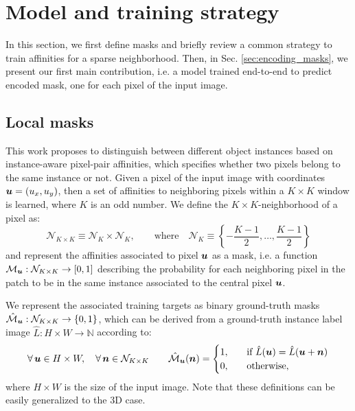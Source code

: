 
\section{Model and training strategy}\label{sec:model}
In this section, we first define \maskname masks and briefly review a common strategy to train affinities for a sparse neighborhood.
Then, in Sec. \ref{sec:encoding_masks}, we present our first main contribution, i.e. a model trained end-to-end to predict encoded \maskname mask, one for each pixel of the input image. 

\subsection{Local \maskname masks}\label{sec:self_masks}
This work proposes to distinguish between different object instances based on instance-aware pixel-pair affinities, which specifies whether two pixels belong to the same instance or not.
Given a pixel of the input image with coordinates $\coord{u}= (u_x, u_y)$, then a set of affinities to neighboring pixels within a $K\times K$ window is learned, where $K$ is an odd number. 
We define the $K\times K$-neighborhood of a pixel as:
\begin{equation}
\mathcal{N}_{K\times K} \equiv \mathcal{N}_{K} \times \mathcal{N}_{K}, \qquad \text{where} \quad \mathcal{N}_{K} \equiv \left\{-\frac{K-1}{2}, \ldots, \frac{K-1}{2}\right\}
\end{equation}
and represent the affinities associated to pixel $\coord{u}$ as a \maskname mask, i.e. a function $\mathcal{M}_{\coord{u}}: \mathcal{N}_{K\times K} \rightarrow [0,1]$ describing the probability for each neighboring pixel in the patch to be in the same instance associated to the central pixel $\coord{u}$.

We represent the associated training targets as binary ground-truth masks $\hat{\mathcal{M}}_{\coord{u}}: \mathcal{N}_{K\times K} \rightarrow \{0,1\}$, which can be derived from a ground-truth instance label image $\hat{L}: H\times W \rightarrow \mathbb{N}$ according to:
\begin{equation}\label{eq:target_masks}
\forall\, \coord{u}\in H\times W, \quad \forall\, \coord{n}\in \mathcal{N}_{K\times K} \qquad \hat{\mathcal{M}}_{\coord{u}}(\coord{n}) = 
\begin{cases}
1, \quad &\text{if } \hat{L}(\coord{u}) = \hat{L}(\coord{u}+\coord{n}) \\
0, \quad & \text{otherwise},
\end{cases}
\end{equation}
where $H\times W$ is the size of the input image. Note that these definitions can be easily generalized to the 3D case.

